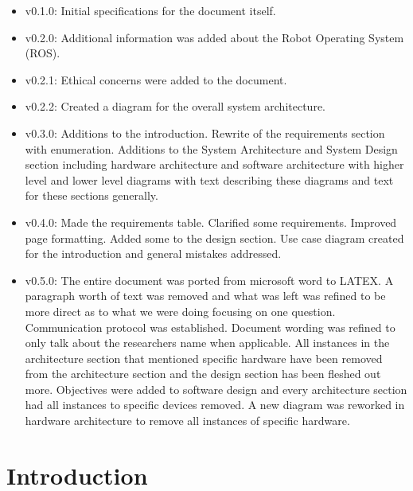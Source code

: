 \documentclass[english,12pt]{article}
\begin{document}
\begin{itemize}
	\item v0.1.0: Initial specifications for the document itself.
    \item v0.2.0: Additional information was added about the Robot 
    Operating System (ROS).
    \item v0.2.1: Ethical concerns were added to the document.
    \item v0.2.2: Created a diagram for the overall system architecture.
    \item v0.3.0: Additions to the introduction. Rewrite of the requirements section with
    enumeration. Additions to the System Architecture and System Design
    section including hardware architecture and software architecture with
    higher level and lower level diagrams with text describing these diagrams
    and text for these sections generally.
    \item v0.4.0: Made the requirements table. Clarified some requirements. Improved page
    formatting. Added some to the design section. Use case diagram created for
    the introduction and general mistakes addressed.
    \item v0.5.0: The entire document was ported from microsoft word to LATEX.
    A paragraph worth of text was removed and what was left was refined to be more direct 
    as to what we were doing focusing on one question. Communication protocol was established.
    Document wording was refined to only talk about the researchers name when applicable.
    All instances in the architecture section that mentioned specific hardware have been 
    removed from the architecture section and the design section has been fleshed out more.
    Objectives were added to software design and every architecture section had all instances to 
    specific devices removed. A new diagram was reworked in hardware architecture to remove all 
    instances of specific hardware.
\end{itemize}
\newpage
\section{Introduction}
\end{document}
